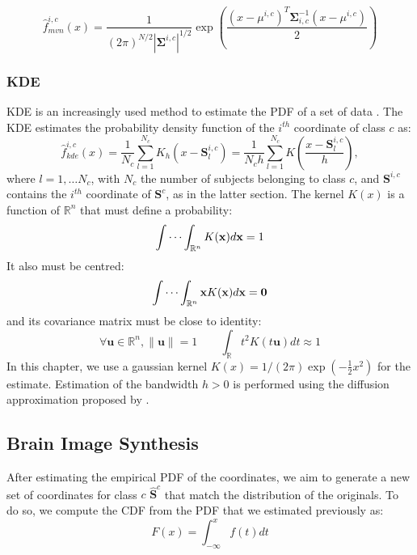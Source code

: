 \begin{equation}
\hat{f}_{mvn}^{i,c}(x) = \frac{1}{(2\pi)^{N/2}\left|\boldsymbol{\Sigma}^{i,c}\right|^{1/2}} \exp{ \left(\frac{(x-\mu^{i,c})^T \boldsymbol{\Sigma}_{i,c}^{-1}(x-\mu^{i,c})}{2}\right)}
\end{equation}

\subsubsection{\acf{KDE}}
\acf{KDE} is an increasingly used method to estimate the \ac{PDF} of a set of data \cite{Botev2010,Simonoff2012}. The \ac{KDE} estimates the probability density function of the $i^{th}$ coordinate of class $c$ as: 
\begin{equation}
\hat{f}_{kde}^{i,c}(x) = \frac{1}{N_c}\sum_{l=1}^{N_c} K_h \left(x - \mathbf{S}^{i,c}_l\right) = \frac{1}{N_c h} \sum_{l=1}^{N_c} K\left(\frac{x-\mathbf{S}^{i,c}_l}{h}\right),
\end{equation}
where $l=1,\dots N_c$, with $N_c$ the number of subjects belonging to class $c$, and $\mathbf{S}^{i,c}$ contains the $i^{th}$ coordinate of $\mathbf{S}^{c}$, as in the latter section. The kernel $K(x)$ is a function of $\mathbb{R}^n$ that must define a probability: 
\begin{equation}
\idotsint_{\mathbb{R}^n} K(\mathbf{x}) d\mathbf{x} = 1
\end{equation}
It also must be centred:
\begin{equation}
\idotsint_{\mathbb{R}^n} \mathbf{x}K(\mathbf{x}) d\mathbf{x} =
\mathbf{0}
\end{equation}
and its covariance matrix must be close to identity:
\begin{equation}
\forall \mathbf{u}\in\mathbb{R}^n, \|\mathbf{u}\| = 1\qquad\int_{\mathbb{R}} t^2K(t \mathbf{u}) dt \approx	1
\end{equation}
In this chapter, we use a gaussian kernel $K(x)=1/(2\pi)\exp(-\frac{1}{2}x^2)$ for the estimate. Estimation of the bandwidth $h>0$ is performed using the diffusion approximation proposed by \cite{Botev2010}.

\subsection{Brain Image Synthesis}
After estimating the empirical \ac{PDF} of the coordinates, we aim to generate a new set of coordinates for class $c$ $\widehat{\mathbf{S}}^c$ that match the distribution of the originals. To do so, we compute the \ac{CDF} from the \ac{PDF} that we estimated previously as:
\begin{equation}
F(x) = \int_{-\infty}^{x} f(t)dt
\end{equation}

